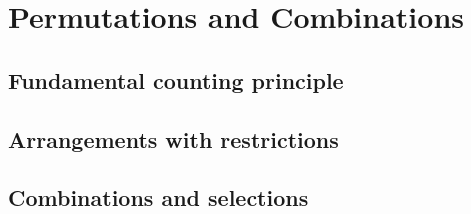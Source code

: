 
\section{Permutations and Combinations}

\subsection{Fundamental counting principle}


\subsection{Arrangements with restrictions}


\subsection{Combinations and selections}

